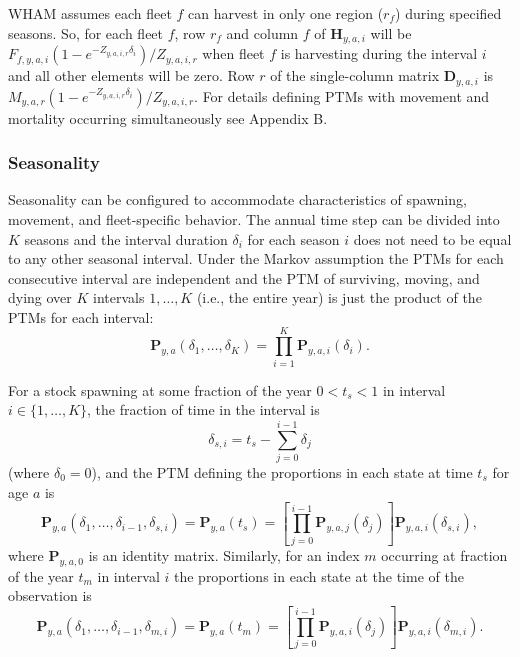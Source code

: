 \documentclass[
]{article}
\begin{document}
WHAM assumes each fleet \(f\) can harvest in only one region (\(r_f\)) during specified seasons. So, for each fleet \(f\), row \(r_f\) and column \(f\) of \(\mathbf{H}_{y,a,i}\) will be \(F_{f,y,a,i}\left(1 - e^{-Z_{y,a,i,r}\delta_i}\right)/Z_{y,a,i,r}\) when fleet \(f\) is harvesting during the interval \(i\) and all other elements will be zero. Row \(r\) of the single-column matrix \(\mathbf{D}_{y,a,i}\) is \(M_{y,a,r}\left(1 - e^{-Z_{y,a,i,r}\delta_i}\right)/Z_{y,a,i,r}\). For details defining PTMs with movement and mortality occurring simultaneously see Appendix B.

\hypertarget{seasonality}{%
\subsubsection*{Seasonality}\label{seasonality}}

Seasonality can be configured to accommodate characteristics of spawning, movement, and fleet-specific behavior. The annual time step can be divided into \(K\) seasons and the interval duration \(\delta_i\) for each season \(i\) does not need to be equal to any other seasonal interval. Under the Markov assumption the PTMs for each consecutive interval are independent and the PTM of surviving, moving, and dying over \(K\) intervals \(1,\ldots, K\) (i.e., the entire year) is just the product of the PTMs for each interval:
\[ \mathbf{P}_{y,a}(\delta_1,\ldots,\delta_K) = \prod^K_{i=1}\mathbf{P}_{y,a,i}(\delta_i).\]

For a stock spawning at some fraction of the year \(0<t_s<1\) in interval \(i \in \{1,\ldots,K\}\), the fraction of time in the interval is
\[\delta_{s,i} = t_s-\sum^{i-1}_{j=0}\delta_j\]
(where \(\delta_0 = 0\)), and the PTM defining the proportions in each state at time \(t_s\) for age \(a\) is
\begin{equation}\label{eq:ptm_spawn}
\mathbf{P}_{y,a}\left(\delta_1,\ldots,\delta_{i-1}, \delta_{s,i}\right) = \mathbf{P}_{y,a}\left(t_s\right) =  \left[\prod^{i-1}_{j=0}\mathbf{P}_{y,a,j}(\delta_j)\right]\mathbf{P}_{y,a,i}(\delta_{s,i}),
\end{equation}
where \(\mathbf{P}_{y,a,0}\) is an identity matrix. Similarly, for an index \(m\) occurring at fraction of the year \(t_m\) in interval \(i\) the proportions in each state at the time of the observation is
\begin{equation} \label{eq:ptm_index} 
\mathbf{P}_{y,a}\left(\delta_1,\ldots,\delta_{i-1}, \delta_{m,i}\right) = \mathbf{P}_{y,a}\left(t_m\right) =   \left[\prod^{i-1}_{j=0}\mathbf{P}_{y,a,i}(\delta_j)\right]\mathbf{P}_{y,a,i}(\delta_{m,i}).
\end{equation}
\end{document}
